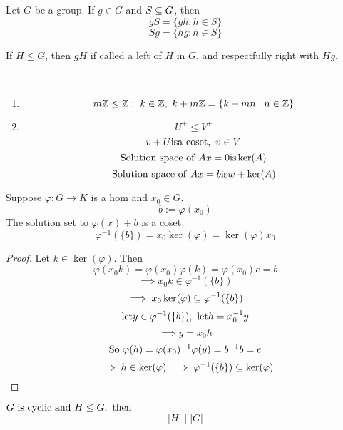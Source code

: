 \documentclass[12pt]{article}
\newcommand{\order}[1]{\left\lvert#1\right\rvert}
\newcommand{\divides}{\mathbin|}
\newcommand\subgroup{\le}
\newcommand\vphi{\varphi}
\begin{document}
\bboxdefn
\begin{defn}[Coset]
    Let \(G\) be a group. If \(g\in G\) and \(S\subseteq G\), then
    \[
        gS=\{gh:h\in S\}
    \]
    \[
        Sg=\{hg:h\in S\}
    \]
    
    If \(H \subgroup G\), then \(gH\) if called a left  of \(H\) in \(G\),
    and respectfully right with \(Hg\).
\end{defn}
\ebox

\bboxexam
\begin{exam}\ 
    \begin{enumerate}
        \item
            \[
                m\Z \subgroup \Z: \
                k\in\Z,\ k+m\Z = \{
                    k+mn : n \in \Z
                \}
            \]
        \item 
            \[
                U^+ \subgroup V^+
            \]
            \[
                v+U\mathrm{is}\mathrm{a\ coset},\ v \in V
            \]
            \[
                \mathrm{Solution\ space\ of\ }Ax=0\mathrm{is}
                \ker(A)
            \]
            \[
                \mathrm{Solution\ space\ of\ }Ax=b\mathrm{is}
                w + \ker(A)
            \]
    \end{enumerate}
\end{exam}
\ebox

\bboxprop
\begin{prop}
    Suppose \(\vphi : G \to K\) is a hom and \(x_0\in G\).
    \[
        b := \vphi(x_0)
    \]
    The solution set to \(\vphi(x)+b\) is a coset
    \[
        \vphi^{-1}(\{b\})
        =x_0\ker(\vphi)=\ker(\vphi)x_0
    \]
\end{prop}
\ebox

\bboxproof
\begin{proof}
    Let \(k\in\ker(\vphi)\). Then
    \[
        \vphi(x_0k)=\vphi(x_0)\vphi(k)=\vphi(x_0)e=b
    \]
    \[
        \implies x_0k\in\vphi^{-1}(\{b\})
    \]
    \[
        \implies x_0\ker(\vphi)\ssq\vphi^{-1}(\{b\})
    \]
    \[
        \llet y\in\vphi^{-1}(\{b\}),\ 
        \llet h=x^{-1}_0 y
    \]
    \[
        \implies y = x_0 h
    \]
    \[
        \T{So }\vphi(h)=\vphi(x_0)^{-1}\vphi(y)
        =b^{-1}b=e
    \]
    \[
        \implies h \in\ker(\vphi)
        \implies \vphi^{-1}(\{b\})\ssq \ker(\vphi)
    \]
\end{proof}
\ebox



\bboxprop
\begin{prop}
    \(G\ \is\ \TR{cyclic}\ \TR{and}\ H\subgroup G,\ \tthen\)
    \[
        \order{H}\divides\order{G}
    \]
\end{prop}
\ebox
\end{document}
